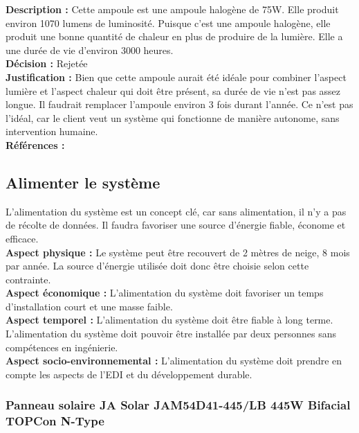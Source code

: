 \noindent
\textbf{Description :} Cette ampoule est une ampoule halogène de 75W. Elle produit
environ 1070 lumens de luminosité. Puisque c’est une ampoule halogène, elle
produit une bonne quantité de chaleur en plus de produire de la lumière. Elle a
une durée de vie d’environ 3000 heures. \\

\noindent
\textbf{Décision :} Rejetée \\

\noindent
\textbf{Justification :} Bien que cette ampoule aurait été idéale pour combiner l’aspect lumière et l’aspect
chaleur qui doit être présent, sa durée de vie n’est pas assez longue. Il
faudrait remplacer l’ampoule environ 3 fois durant l’année. Ce n’est pas
l’idéal, car le client veut un système qui fonctionne de manière autonome, sans
intervention humaine. \\

\noindent
\textbf{Références :} \cite{7} \\



\subsection{Alimenter le système}

L’alimentation du système est un concept clé, car sans alimentation, il n’y a
pas de récolte de données. Il faudra favoriser une source d’énergie fiable,
économe et efficace. \\

\noindent
\textbf{Aspect physique :} Le système peut être recouvert de 2
mètres de neige, 8 mois par année. La source d’énergie utilisée doit donc être
choisie selon cette contrainte. \\
\textbf{Aspect économique :} L’alimentation du système
doit favoriser un temps d’installation court et une masse faible. \\
\textbf{Aspect temporel :} L’alimentation du système doit être fiable à long terme.
L’alimentation du système doit pouvoir être installée par deux personnes sans
compétences en ingénierie. \\
\textbf{Aspect socio-environnemental :} L’alimentation du
système doit prendre en compte les aspects de l’EDI et du développement
durable.

\subsubsection{Panneau solaire JA Solar JAM54D41-445/LB 445W Bifacial TOPCon N-Type}

